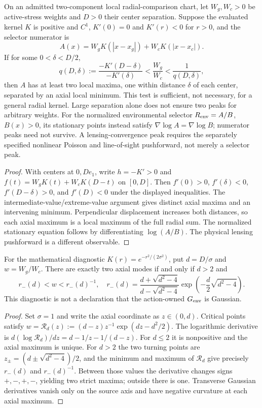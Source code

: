 \documentclass[12pt,a4paper]{article}
\begin{document}
\begin{corollary}
\label{p8:cor:two-component-merger-morphology}
On an admitted two-component local radial-comparison chart, let
$W_g,W_c>0$ be active-stress weights and $D>0$ their center separation.
Suppose the evaluated kernel $K$ is positive and $C^1$,
$K'(0)=0$ and $K'(r)<0$ for $r>0$, and the selector numerator is
\begin{equation}
\label{p8:eq:two-component-selector-field}
 A(x)=W_gK(|x-x_g|)+W_cK(|x-x_c|).
\end{equation}
If for some $0<\delta<D/2$,
\[
 q(D,\delta):=\frac{-K'(D-\delta)}{-K'(\delta)}
 <\frac{W_g}{W_c}<\frac1{q(D,\delta)},
\]
then $A$ has at least two local maxima, one within distance $\delta$
of each center, separated by an axial local minimum.
This test is sufficient, not necessary, for a general radial kernel.
Large separation alone does not ensure two peaks for arbitrary weights.
For the normalized environmental selector $R_{\rm env}=A/B$,
$B(x)>0$, its stationary points instead satisfy
$\nabla\log A=\nabla\log B$; numerator peaks need not survive.
A lensing-convergence peak requires the separately specified nonlinear
Poisson and line-of-sight pushforward, not merely a selector peak.
\end{corollary}
\begin{proof}
With centers at $0,De_1$, write $h=-K'>0$ and
$f(t)=W_gK(t)+W_cK(D-t)$ on $[0,D]$.
Then $f'(0)>0$, $f'(\delta)<0$,
$f'(D-\delta)>0$, and $f'(D)<0$ under the displayed inequalities.
The intermediate-value/extreme-value argument gives distinct axial
maxima and an intervening minimum. Perpendicular displacement increases
both distances, so each axial maximum is a local maximum of the full
radial sum. The normalized stationary equation follows by differentiating
$\log(A/B)$. The physical lensing pushforward is a different observable.
\end{proof}
\begin{proposition}
\label{p8:prop:v382-gaussian-two-mode-control}
For the mathematical diagnostic $K(r)=e^{-r^2/(2\sigma^2)}$, put
$d=D/\sigma$ and $w=W_g/W_c$. There are exactly two axial modes
if and only if $d>2$ and
\[
 r_-(d)<w<r_-(d)^{-1},\quad
 r_-(d)=\frac{d+\sqrt{d^2-4}}{d-\sqrt{d^2-4}}
 \exp\!\left(-\frac d2\sqrt{d^2-4}\right).
\]
This diagnostic is not a declaration that the action-owned $G_{\rm env}$
is Gaussian.
\end{proposition}
\begin{proof}
Set $\sigma=1$ and write the axial coordinate as $z\in(0,d)$.
Critical points satisfy
$w=\mathcal R_d(z):=(d-z)z^{-1}\exp(dz-d^2/2)$.
The logarithmic derivative is
$d(\log\mathcal R_d)/dz=d-1/z-1/(d-z)$.
For $d\le2$ it is nonpositive and the axial maximum is unique.
For $d>2$ the two turning points are
$z_\pm=(d\pm\sqrt{d^2-4})/2$, and the minimum and maximum of
$\mathcal R_d$ give precisely $r_-(d)$ and $r_-(d)^{-1}$.
Between those values the derivative changes signs $+,-,+,-$,
yielding two strict maxima; outside there is one. Transverse
Gaussian derivatives vanish only on the source axis and have negative
curvature at each axial maximum.
\end{proof}
\end{document}
